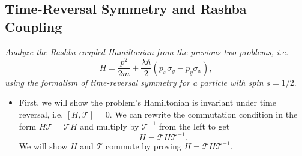 \documentclass[11pt, a4paper]{article}
\newcommand{\T}{\mathcal{T}}  %
\begin{document}
	
	
	
\subsection{Time-Reversal Symmetry and Rashba Coupling}
\textit{Analyze the Rashba-coupled Hamiltonian from the previous two problems, i.e.}
\begin{equation*}
	H = \frac{p^{2}}{2m} + \frac{\lambda\hbar}{2} (p_{x}\sigma_{y} - p_{y}\sigma_{x}),
\end{equation*}
\textit{using the formalism of time-reversal symmetry for a particle with spin $ s = 1/2 $}.

\begin{itemize}	
	\item First, we will show the problem's Hamiltonian is invariant under time reversal, i.e. $ [H, \T] = 0 $. We can rewrite the commutation condition in the form $ H\T = \T H $ and multiply by $ \T^{-1} $ from the left to get
	\begin{equation*}
		H = \T H \T^{-1}.
	\end{equation*}
	We will show $ H $ and $ \T $ commute by proving $ H = \T H \T^{-1} $.
	

\end{itemize}
\end{document}
